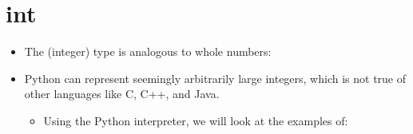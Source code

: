 \documentclass[letterpaper,10pt,english]{sphinxmanual}
\begin{document}
\section{int}
\label{\detokenize{lecture_notes/lec02_calculator:int}}\begin{itemize}
\item {} 
The  (integer) type is analogous to whole numbers:

\begin{sphinxVerbatim}[commandchars=\\\{\}]
          
\end{sphinxVerbatim}

\item {} 
Python can represent seemingly arbitrarily large integers, which is
not true of other languages like C, C++, and Java.
\begin{itemize}
\item {} 
Using the Python interpreter, we will look at the examples of:

\begin{sphinxVerbatim}[commandchars=\\\{\}]
\end{sphinxVerbatim}

\end{itemize}

\end{itemize}
\end{document}
